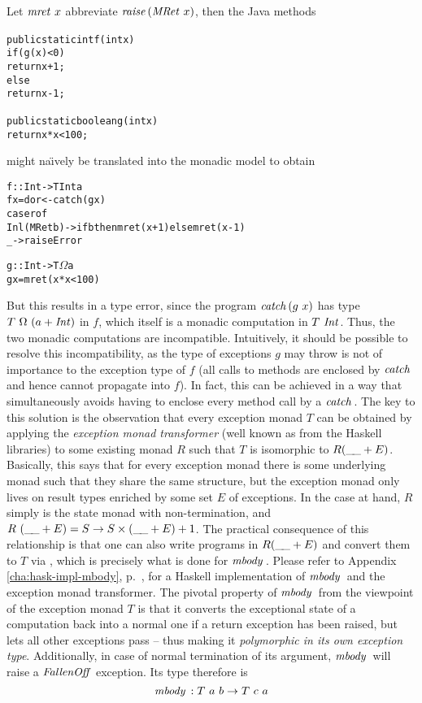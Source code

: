 \begin{expl} \label{ex:java-to-monad}
Let $\mathit{mret}\ x$ abbreviate $\mathit{raise}\,
(\mathit{MRet}\ x)$, then the Java methods
\begin{alltt}
public static int f(int x) {
  if (g(x) < 0)
    return x + 1;
  else
    return x - 1;
}

public static boolean g(int x) {
  return x*x < 100;
}
\end{alltt}
might na\"\i vely be translated into the monadic model  to obtain
\begin{alltt}
f :: Int -> T Int a
f x = do r <- catch (g x)
         case r of 
           Inl (MRet b) -> if b then mret (x+1) else mret (x-1)
           _            -> raise Error

g :: Int -> T \(\Omega\) a
g x = mret (x * x < 100)
\end{alltt}
But this results in a type error, since the program $\mathit{catch}\, (g\ x)$ has type
$T\ \Omega\ (a + \mathit{Int})$ in $f$, which itself is a monadic computation in $T\
\mathit{Int}$. Thus, the two monadic computations are incompatible. Intuitively, it
should be possible to resolve this incompatibility, as the type of exceptions
$g$ may throw is not of importance to the exception type of $f$ (all calls to
methods are enclosed by $\mathit{catch}\,$ and hence cannot propagate into $f$). In
fact, this can be achieved in a way that simultaneously avoids having to enclose
every method call by a $\mathit{catch}\,$. The key to this solution is the observation
that every exception monad $T$ can be obtained by applying the \emph{exception
  monad transformer} (well known as \code{ErrorT} from the Haskell libraries) to
some existing monad $R$ such that $T$ is isomorphic to $R(\_\!\_ + E)$. Basically,
this says that for every exception monad there is some underlying monad such
that they share the same structure, but the exception monad only lives on result
types enriched by some set $E$ of exceptions. In the case at hand, $R$ simply is
the state monad with non-termination, and $R\ (\_\!\_+E) = S \to S \times (\_\!\_+E) + 1$.
The practical consequence of this relationship is that one can also write
programs in $R(\_\!\_+E)$ and convert them to $T$ via \code{ErrorT}, which is
precisely what is done for $\mathit{mbody}\,$. Please refer to Appendix
\ref{cha:hask-impl-mbody}, p.~\pageref{page:mbody-def}, for a Haskell implementation
of $\mathit{mbody}\,$ and the exception monad transformer. The pivotal property of
$\mathit{mbody}\,$ from the viewpoint of the exception monad $T$ is that it converts the
exceptional state of a computation back into a normal one if a return exception
has been raised, but lets all other exceptions pass -- thus making it
\emph{polymorphic in its own exception type}. Additionally, in case of normal
termination of its argument, $\mathit{mbody}\,$ will raise a $\mathit{FallenOff}$ exception.
Its type therefore is
\[
  \mbody : T\ a\ b \to T\ c\ a
\]


\end{expl}
